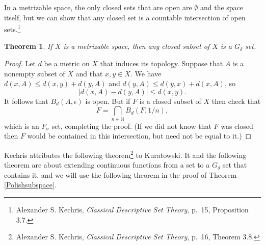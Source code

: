 \documentclass{article}
\newtheorem{theorem}{Theorem}
\theoremstyle{definition}
\begin{document}
In a metrizable space, the only closed sets that are open are $\emptyset$ and the space itself, but we can show that
any closed set is a countable intersection of open sets.\footnote{Alexander S. Kechris, {\em Classical Descriptive Set Theory}, p.~15, Proposition 3.7.}

\begin{theorem}
If $X$ is a metrizable space, then any closed subset of $X$ is a $G_\delta$ set.
\label{closedGdelta}
\end{theorem}
\begin{proof}
Let $d$ be a metric on $X$ that induces its topology. Suppose that $A$ is a nonempty subset of $X$ and that $x,y \in X$. We have
$d(x,A) \leq d(x,y)+d(y,A)$ and $d(y,A) \leq d(y,x) + d(x,A)$, so
\[
|d(x,A) - d(y,A)| \leq d(x,y).
\]
It follows that $B_d(A,\epsilon)$ is open. But if $F$ is a closed subset of $X$ then check that 
\[
F = \bigcap_{n \in \mathbb{N}} B_d(F,1/n),
\]
which is an $F_\sigma$ set, completing the proof. (If we did not know that $F$ was closed then  $F$ would be contained in this intersection, but
need not be equal to it.)
\end{proof}

Kechris attributes the following theorem\footnote{Alexander S. Kechris, {\em Classical Descriptive Set Theory}, p.~16,
Theorem 3.8.}
 to Kuratowski. It and the following theorem are about extending continuous functions from a set to a $G_\delta$ 
set that contains it, and  we will use the following theorem in the proof of Theorem \ref{Polishsubspace}.
\end{document}
